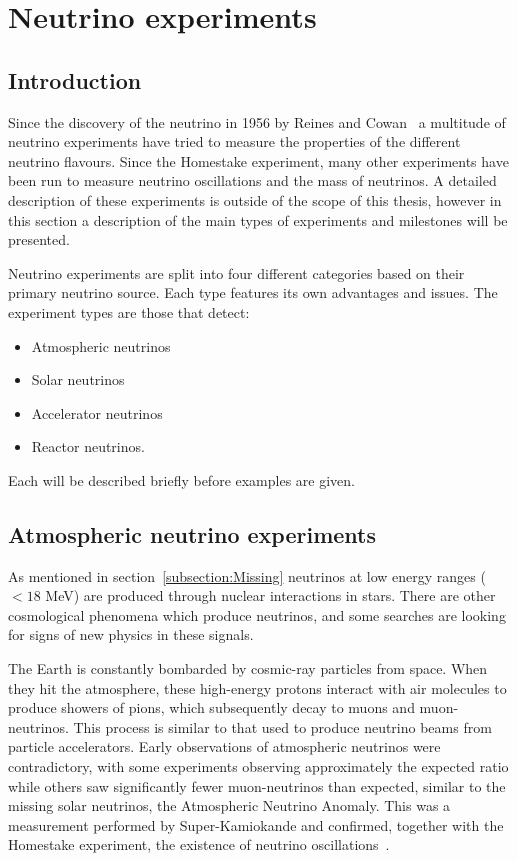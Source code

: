 \chapter{Neutrino experiments}
\label{c:expIntro}

\section{Introduction}
Since the discovery of the neutrino in 1956 by Reines and Cowan~\cite{6Reines} a multitude of neutrino experiments have tried to measure the properties of the different neutrino flavours. Since the Homestake experiment, many other experiments have been run to measure neutrino oscillations and the mass of neutrinos. A detailed description of these experiments is outside of the scope of this thesis, however in this section a description of the main types of experiments and milestones will be presented.

Neutrino experiments are split into four different categories based on their primary neutrino source. Each type features its own advantages and issues.
The experiment types are those that detect:
\begin{itemize}
\item Atmospheric neutrinos
\item Solar neutrinos
\item Accelerator neutrinos
\item Reactor neutrinos.
\end{itemize}
Each will be described briefly before examples are given.

\pagebreak
\newpage
\section{Atmospheric neutrino experiments}

As mentioned in section~\ref{subsection:Missing} neutrinos at low energy ranges ($<18$ MeV) are produced through nuclear interactions in stars. There are other cosmological phenomena which produce neutrinos, and some searches are looking for signs of new physics in these signals. 

The Earth is constantly bombarded by cosmic-ray particles from space. When they hit the atmosphere, these high-energy protons interact with air molecules to produce showers of pions, which subsequently decay to muons and muon-neutrinos. This process is similar to that used to produce neutrino beams from particle accelerators. Early observations of atmospheric neutrinos were contradictory, with some experiments observing approximately the expected ratio while others saw significantly fewer muon-neutrinos than expected, similar to the missing solar neutrinos, the Atmospheric Neutrino Anomaly. This was a measurement performed by Super-Kamiokande and confirmed, together with the Homestake experiment, the existence of neutrino oscillations~\cite{10Fukuda, 9Davis}.

